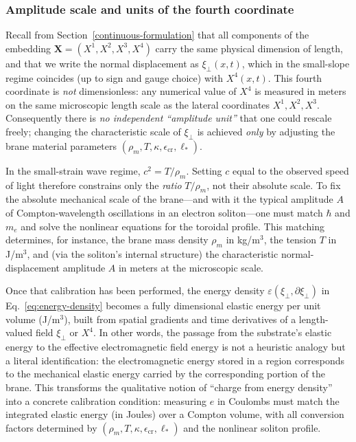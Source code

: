\subsubsection{Amplitude scale and units of the fourth coordinate}
\label{sec:amplitude-scale}

Recall from Section~\ref{continuous-formulation} that all components of the
embedding $\mathbf X=(X^1,X^2,X^3,X^4)$ carry the same physical dimension of
length, and that we write the normal displacement as $\xi_\perp(x,t)$, which
in the small-slope regime coincides (up to sign and gauge choice) with
$X^4(x,t)$. This fourth coordinate is \emph{not} dimensionless: any numerical
value of $X^4$ is measured in meters on the same microscopic length scale as
the lateral coordinates $X^1,X^2,X^3$. Consequently there is \emph{no
independent ``amplitude unit''} that one could rescale freely; changing the
characteristic scale of $\xi_\perp$ is achieved \emph{only} by adjusting the
brane material parameters $(\rho_m,T,\kappa,\epsilon_{\mathrm{cr}},\ell_\ast)$.

In the small-strain wave regime, $c^2 = T/\rho_m$. Setting $c$ equal to the
observed speed of light therefore constrains only the \emph{ratio}
$T/\rho_m$, not their absolute scale. To fix the absolute mechanical scale of
the brane---and with it the typical amplitude $A$ of Compton-wavelength
oscillations in an electron soliton---one must match $\hbar$ and $m_e$ and
solve the nonlinear equations for the toroidal profile. This matching
determines, for instance, the brane mass density $\rho_m$ in kg/m$^3$, the
tension $T$ in J/m$^3$, and (via the soliton's internal structure) the
characteristic normal-displacement amplitude $A$ in meters at the
microscopic scale.

Once that calibration has been performed, the energy density
$\varepsilon(\xi_\perp,\partial\xi_\perp)$ in Eq.~\eqref{eq:energy-density}
becomes a fully dimensional elastic energy per unit volume (J/m$^3$), built
from spatial gradients and time derivatives of a length-valued field
$\xi_\perp$ or $X^4$. In other words, the passage from the substrate's
elastic energy to the effective electromagnetic field energy is not a
heuristic analogy but a literal identification: the electromagnetic energy
stored in a region corresponds to the mechanical elastic energy carried by
the corresponding portion of the brane. This transforms the qualitative
notion of ``charge from energy density'' into a concrete calibration
condition: measuring $e$ in Coulombs must match the integrated elastic
energy (in Joules) over a Compton volume, with all conversion factors
determined by $(\rho_m,T,\kappa,\epsilon_{\mathrm{cr}},\ell_\ast)$ and the
nonlinear soliton profile.

